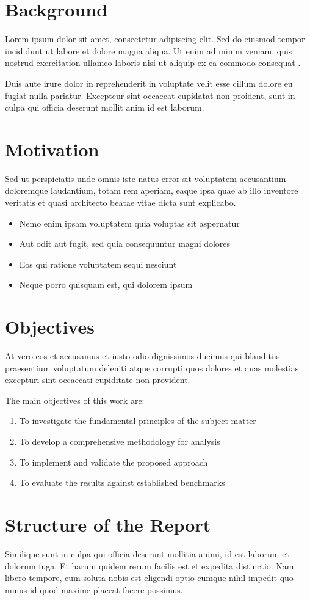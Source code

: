 \documentclass[../main.tex]{subfiles}
\begin{document}
\section{Background}

Lorem ipsum dolor sit amet, consectetur adipiscing elit. Sed do eiusmod tempor incididunt ut labore et dolore magna aliqua. Ut enim ad minim veniam, quis nostrud exercitation ullamco laboris nisi ut aliquip ex ea commodo consequat \parencite{example2024}.

Duis aute irure dolor in reprehenderit in voluptate velit esse cillum dolore eu fugiat nulla pariatur. Excepteur sint occaecat cupidatat non proident, sunt in culpa qui officia deserunt mollit anim id est laborum.

\section{Motivation}

Sed ut perspiciatis unde omnis iste natus error sit voluptatem accusantium doloremque laudantium, totam rem aperiam, eaque ipsa quae ab illo inventore veritatis et quasi architecto beatae vitae dicta sunt explicabo.

\begin{itemize}
    \item Nemo enim ipsam voluptatem quia voluptas sit aspernatur
    \item Aut odit aut fugit, sed quia consequuntur magni dolores
    \item Eos qui ratione voluptatem sequi nesciunt
    \item Neque porro quisquam est, qui dolorem ipsum
\end{itemize}

\section{Objectives}

At vero eos et accusamus et iusto odio dignissimos ducimus qui blanditiis praesentium voluptatum deleniti atque corrupti quos dolores et quas molestias excepturi sint occaecati cupiditate non provident.

The main objectives of this work are:
\begin{enumerate}
    \item To investigate the fundamental principles of the subject matter
    \item To develop a comprehensive methodology for analysis
    \item To implement and validate the proposed approach
    \item To evaluate the results against established benchmarks
\end{enumerate}

\section{Structure of the Report}

Similique sunt in culpa qui officia deserunt mollitia animi, id est laborum et dolorum fuga. Et harum quidem rerum facilis est et expedita distinctio. Nam libero tempore, cum soluta nobis est eligendi optio cumque nihil impedit quo minus id quod maxime placeat facere possimus.
\end{document}
